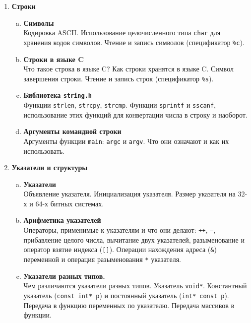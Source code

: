 \documentclass{article}
\begin{document}
\begin{enumerate}
\item \textbf{Строки}\\

\begin{enumerate}[a.]
\item \textbf{Символы}\\
Кодировка ASCII. Использование целочисленного типа \texttt{char} для хранения кодов символов. Чтение и запись символов (спецификатор \texttt{\%с}).

\item \textbf{Строки в языке C}\\
Что такое строка в языке C? Как строки хранятся в языке C. Символ завершения строки. Чтение и запись строк (спецификатор \texttt{\%s}).

\item \textbf{Библиотека \texttt{string.h}}\\
Функции \texttt{strlen}, \texttt{strcpy}, \texttt{strcmp}. Функции \texttt{sprintf} и \texttt{sscanf}, использование этих функций для конвертации числа в строку и наоборот.

\item \textbf{Аргументы командной строки}\\
Аргументы функции \texttt{main}: \texttt{argc} и \texttt{argv}. Что они означают и как их использовать.
\end{enumerate}





\item \textbf{Указатели и структуры}\\

\begin{enumerate}[a.]
\item \textbf{Указатели}\\
Объявление указателя. Инициализация указателя. Размер указателя на 32-х и 64-х битных системах.

\item \textbf{Арифметика указателей}\\
Операторы, применимые к указателям и что они делают: \texttt{++}, \texttt{--}, прибавление целого числа, вычитание двух указателей, разыменование и оператор взятие индекса (\texttt{[]}). Операции нахождения адреса (\texttt{\&}) переменной и операция разыменования \texttt{*} указателя.

\item \textbf{Указатели разных типов.}\\
Чем различаются указатели разных типов. Указатель \texttt{void*}. Константный указатель (\texttt{const int* p}) и постоянный указатель (\texttt{int* const p}). Передача в функцию переменных по указателю. Передача массивов в функции.


\end{enumerate}
\end{enumerate}
\end{document}
